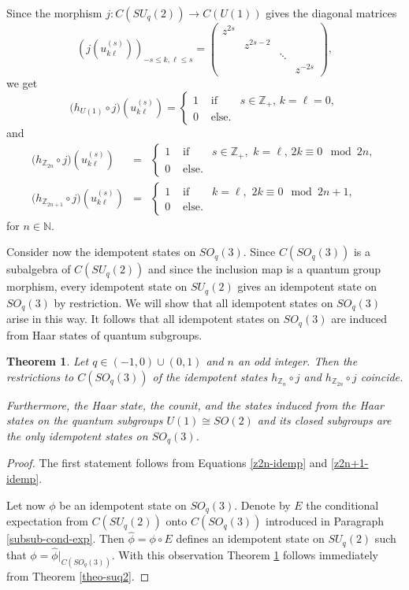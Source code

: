 \documentclass[12pt]{amsart}
\newtheorem{theorem}{Theorem}[section]
\theoremstyle{definition}
\theoremstyle{remark}
\numberwithin{equation}{section}
\begin{document}
Since the morphism $j:C(SU_q(2))\to C(U(1))$ gives the diagonal matrices
\[
\left(j(u^{(s)}_{k\ell})\right)_{-s\le k,\ell\le s} =
\left(\begin{array}{cccc}
z^{2s} &  & & \\
 & z^{2s-2} & & \\
 & & \ddots & \\
 & & & z^{-2s}
\end{array}\right),
\]
we get
\begin{equation} \label{u1-idemp}
\big(h_{U(1)}\circ j\big)(u^{(s)}_{k\ell}) = \left\{
\begin{array}{lll}
1 & \mbox{ if } & s\in\mathbb{Z}_+,\, k=\ell=0, \\
0 & \mbox{ else.}&
\end{array}\right.
\end{equation}
and
\begin{eqnarray}\label{z2n-idemp}
\big(h_{\mathbb{Z}_{2n}}\circ j\big)(u^{(s)}_{k\ell}) &=& \left\{
\begin{array}{lll}
1 & \mbox{ if } & s\in\mathbb{Z}_+,\,\, k=\ell,\, 2k\equiv0 \!\!\mod 2n, \\
0 & \mbox{ else.}&
\end{array}\right. \\
\label{z2n+1-idemp}
\big(h_{\mathbb{Z}_{2n+1}}\circ j\big)(u^{(s)}_{k\ell}) &=& \left\{
\begin{array}{lll}
1 & \mbox{ if } & k=\ell, \,\, 2k\equiv0 \!\!\mod 2n+1, \\
0 & \mbox{ else.}&
\end{array}\right.
\end{eqnarray}
for $n\in\mathbb{N}$.

Consider now the idempotent states on $SO_q(3)$. Since $C(SO_q(3))$ is a
subalgebra of $C(SU_q(2))$ and since the inclusion map is a quantum group
morphism, every idempotent state on $SU_q(2)$ gives an idempotent state on
$SO_q(3)$ by restriction. We will show that all idempotent states on $SO_q(3)$
arise in this way. It follows that all idempotent states on $SO_q(3)$ are
induced from Haar states of quantum subgroups.
\begin{theorem}\label{theo-soq3}
Let $q\in(-1,0)\cup(0,1)$ and $n$ an odd integer. Then the  restrictions to $C(SO_q(3))$ of the idempotent
states $h_{\mathbb{Z}_{n}}\circ j$ and $h_{\mathbb{Z}_{2n}}\circ j$ coincide.

Furthermore, the Haar state, the counit, and the states induced from the Haar
states on the quantum subgroups $U(1)\cong SO(2)$ and its closed subgroups are the
only idempotent states on $SO_q(3)$.
\end{theorem}
\begin{proof}
The first statement follows from Equations \eqref{z2n-idemp} and \eqref{z2n+1-idemp}.

Let now $\phi$ be an idempotent state on $SO_q(3)$. Denote by $E$ the conditional expectation from
$C(SU_q(2))$ onto $C(SO_q(3))$ introduced in Paragraph \ref{subsub-cond-exp}. Then
$\hat{\phi}=\phi\circ E$ defines an idempotent state on $SU_q(2)$ such that
$\phi=\hat{\phi}|_{C(SO_q(3))}$. With this observation Theorem \ref{theo-soq3} follows immediately
from Theorem \ref{theo-suq2}.
\end{proof}
\end{document}
